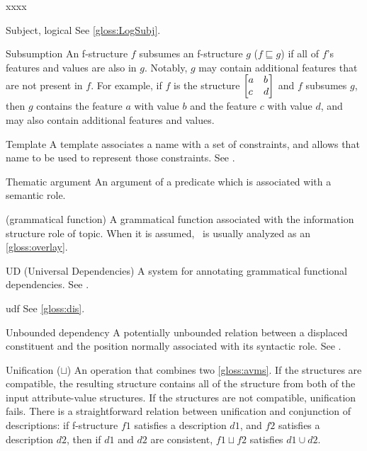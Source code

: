 \documentclass[output=paper,colorlinks,citecolor=brown]{langscibook}
\begin{document}
\begin{labeling}{xxxx}
\item[Subject, logical] See \ref{gloss:LogSubj}.

\item[Subsumption] An f-structure $f$ subsumes an f-structure $g$ ($f \sqsubseteq g$) if all of $f$'s features and values are also in $g$.  Notably, $g$ may contain additional features that are not present in  $f$.  For example, if $f$ is the structure $\left[\begin{array}{@{}ll@{}}a & b\\c & d\end{array}\right]$ and $f$ subsumes $g$, then $g$ contains the feature $a$ with value $b$ and the feature $c$ with value $d$, and may also contain additional features and values.

\item[Template\namedlabel{gloss:template}{template}\namedlabel{gloss:templates}{templates}] A template associates a name with a set of constraints, and allows that name to be used to represent those constraints.  See \citetv[\ref{sec:CoreConcepts:templates}]{chapters/CoreConcepts}.

\item[Thematic argument\namedlabel{gloss:thematicarguments}{thematic arguments}] An argument of a predicate which is associated with a semantic role.

\item[\TOPIC\namedlabel{gloss:topic}{\TOPIC}] (grammatical function) A grammatical function associated with the information structure role of topic.  When it is assumed, \TOPIC\ is usually analyzed as an \ref{gloss:overlay}.

\item[UD (Universal Dependencies)] A system for annotating grammatical functional dependencies.  See .

\item[udf] See \ref{gloss:dis}.

\item[Unbounded dependency\namedlabel{gloss:UBD}{Unbounded dependency}\namedlabel{gloss:ubd}{unbounded dependency}] A potentially unbounded relation between a displaced constituent and the position normally associated with its syntactic role.  See .

\item[Unification ($\sqcup$)\namedlabel{gloss:unification}{unification}] An operation that combines two \ref{gloss:avms}.  If the structures are compatible, the resulting structure contains all of the structure from both of the input attribute-value structures.  If the structures are not compatible, unification fails. There is a straightforward relation between unification and conjunction of descriptions: if f-structure $f1$ satisfies a description $d1$, and $f2$ satisfies a description $d2$, then if $d1$ and $d2$ are consistent, $f1 \sqcup f2$ satisfies $d1 \cup d2$.


\end{labeling}
\end{document}
